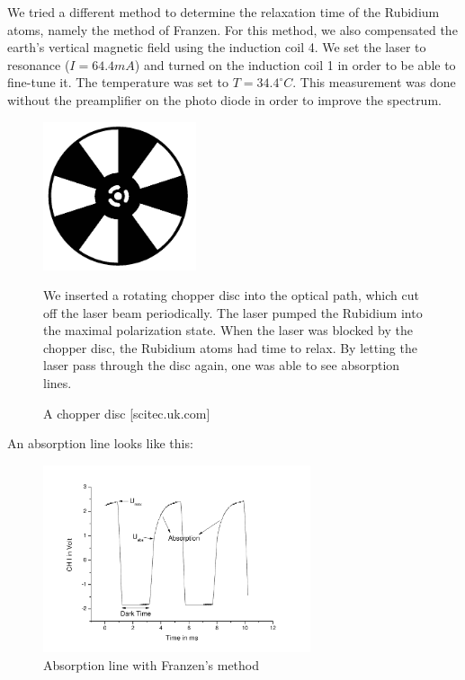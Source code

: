 We tried a different method to determine the relaxation time of the Rubidium atoms, namely the method of Franzen. For this method, we also compensated the earth's vertical magnetic field using the induction coil 4. We set the laser to resonance ($I=64.4 mA$) and turned on the induction coil 1 in order to be able to fine-tune it. The temperature was set to $T=34.4^\circ C$. This measurement was done without the preamplifier on the photo diode in order to improve the spectrum.\\

\begin{figure}[H]
\begin{minipage}{0.5\textwidth}
\centering \includegraphics[width=0.4\textwidth]{BilderAusw/chopper.png}
\caption{A chopper disc [scitec.uk.com]}
\end{minipage}
\begin{minipage}{0.5\textwidth}
We inserted a rotating chopper disc into the optical path, which cut off the laser beam periodically. The laser pumped the Rubidium into the maximal polarization state. When the laser was blocked by the chopper disc, the Rubidium atoms had time to relax. By letting the laser pass through the disc again, one was able to see absorption lines.\\

\end{minipage}
\end{figure}

An absorption line looks like this:

\begin{figure}[H]
\centering \includegraphics[width=0.7\textwidth]{BilderAusw/FranzenBsp.pdf}
\caption{Absorption line with Franzen's method}
\end{figure}

